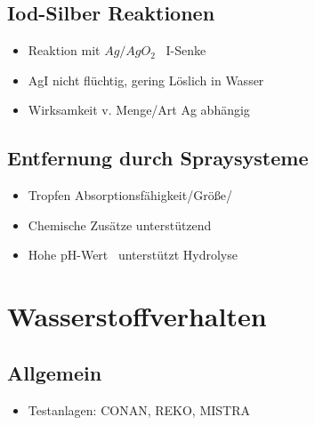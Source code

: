 \documentclass[12pt]{article}
\begin{document}
\subsection{Iod-Silber Reaktionen}
\begin{itemize}
  \item Reaktion mit \(Ag/AgO_2\) \textrightarrow\ I-Senke
  \item AgI nicht flüchtig, gering Löslich in Wasser
  \item Wirksamkeit v. Menge/Art Ag abhängig
\end{itemize}

\subsection{Entfernung durch Spraysysteme}
\begin{itemize}
  \item Tropfen Absorptionsfähigkeit/Größe/
  \item Chemische Zusätze unterstützend
  \item Hohe pH-Wert \textrightarrow\ unterstützt Hydrolyse
\end{itemize}

\section{Wasserstoffverhalten}

\subsection{Allgemein}
\begin{itemize}
  \item Testanlagen: CONAN, REKO, MISTRA
\end{itemize}
\end{document}
